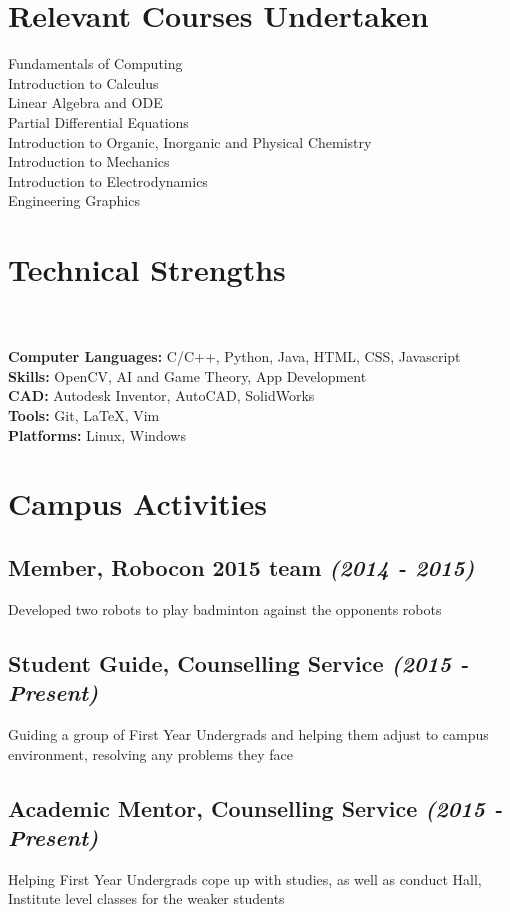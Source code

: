 \documentclass[8pt]{extreport}
\begin{document}
    \section*{Relevant Courses Undertaken}
        \hrulefill
        \renewcommand{\labelitemi}{}
        \begin{multicols}{2}
            \noindent
                    Fundamentals of Computing \\
                    Introduction to Calculus \\
                    Linear Algebra and ODE \\
                    Partial Differential Equations \\
                    Introduction to Organic, Inorganic and Physical Chemistry \\
                    Introduction to Mechanics \\
                    Introduction to Electrodynamics \\
                    Engineering Graphics
    \end{multicols}
    \section*{Technical Strengths}
        \hrulefill \\ \\
        \textbf{Computer Languages: }C/C++, Python, Java, HTML, CSS, Javascript \\
        \textbf{Skills: }OpenCV, AI and Game Theory, App Development \\
        \textbf{CAD: }Autodesk Inventor, AutoCAD, SolidWorks \\
        \textbf{Tools: }Git, \LaTeX, Vim \\
        \textbf{Platforms: }Linux, Windows
    \section*{Campus Activities}
        \hrulefill
        \subsection*{Member, Robocon 2015 team \hfill \textit{\small{(2014 - 2015)}}}
        Developed two robots to play badminton against the opponents robots
        \subsection*{Student Guide, Counselling Service \hfill \textit{\small{(2015 - Present)}}}
        Guiding a group of First Year Undergrads and helping them adjust to campus environment, resolving any problems they face
        \subsection*{Academic Mentor, Counselling Service \hfill \textit{\small{(2015 - Present)}}}
        Helping First Year Undergrads cope up with studies, as well as conduct Hall, Institute level classes for the weaker students
\end{document}
